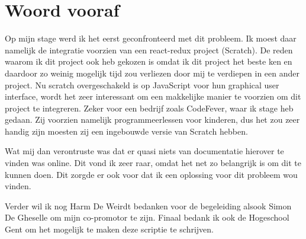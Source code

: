 
\chapter*{Woord vooraf}
\label{ch:voorwoord}


Op mijn stage werd ik het eerst geconfronteerd met dit probleem. Ik moest daar namelijk de integratie voorzien van een react-redux project (Scratch). De reden waarom ik dit project ook heb gekozen is omdat ik dit project het beste ken en daardoor zo weinig mogelijk tijd zou verliezen door mij te verdiepen in een ander project. Nu scratch overgeschakeld is op JavaScript voor hun graphical user interface, wordt het zeer interessant om een makkelijke manier te voorzien om dit project te integreren. Zeker voor een bedrijf zoals CodeFever, waar ik stage heb gedaan. Zij voorzien namelijk programmeerlessen voor kinderen, dus het zou zeer handig zijn moesten zij een ingebouwde versie van Scratch hebben. 

Wat mij dan verontruste was dat er quasi niets van documentatie hierover te vinden was online. Dit vond ik zeer raar, omdat het net zo belangrijk is om dit te kunnen doen. Dit zorgde er ook voor dat ik een oplossing voor dit probleem wou vinden. 

Verder wil ik nog Harm De Weirdt bedanken voor de begeleiding alsook Simon De Gheselle om mijn co-promotor te zijn. Finaal bedank ik ook de Hogeschool Gent om het mogelijk te maken deze scriptie te schrijven.